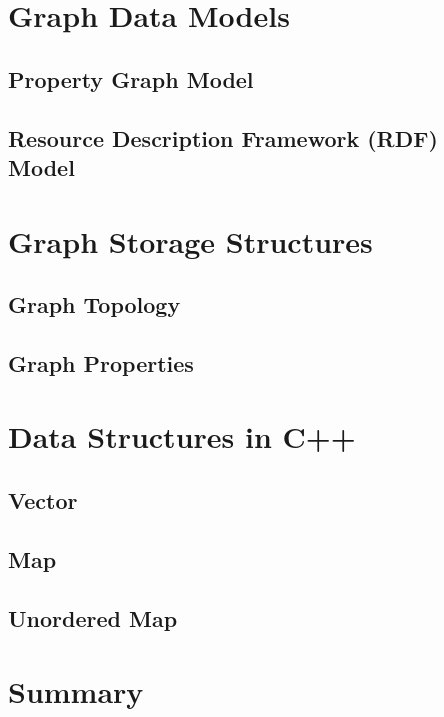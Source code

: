 {\begin{itemize}
\end{itemize}

\section{Graph Data Models}
\label{sec:GraphModels}

\subsection{Property Graph Model}
\label{subsec:PGM}
\subsection{Resource Description Framework (RDF) Model}
\label{subsec:RDF}


\section{Graph Storage Structures}
\label{sec:StorageStructures}

\subsection{Graph Topology}
\subsection{Graph Properties}


\section{Data Structures in C++}
\label{sec:DataStructuresInC++}

\subsection{Vector}
\subsection{Map}
\subsection{Unordered Map}

\section{Summary}
\label{sec:BackgroundSummary}

}